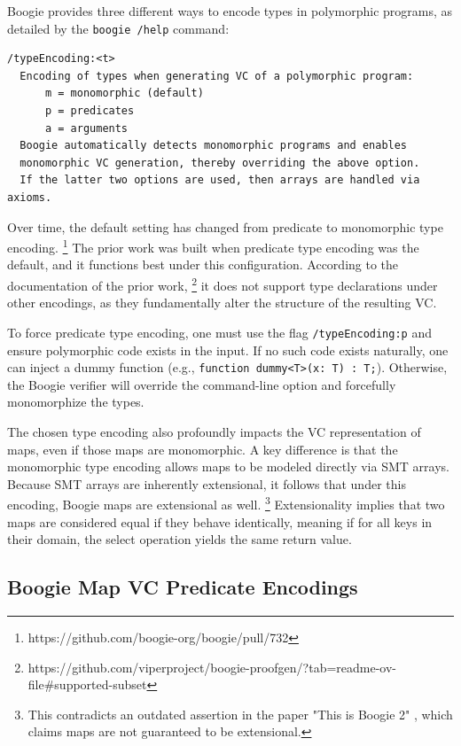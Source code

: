 \documentclass[11pt]{article}
\begin{document}
Boogie provides three different ways to encode types in polymorphic programs,
as detailed by the \texttt{boogie /help} command:

\begin{verbatim}
/typeEncoding:<t>
  Encoding of types when generating VC of a polymorphic program:
      m = monomorphic (default)
      p = predicates
      a = arguments
  Boogie automatically detects monomorphic programs and enables
  monomorphic VC generation, thereby overriding the above option.
  If the latter two options are used, then arrays are handled via axioms.
\end{verbatim}

Over time, the default setting has changed from predicate to monomorphic type encoding.
\footnote{https://github.com/boogie-org/boogie/pull/732}
The prior work was built when predicate type encoding was the default,
and it functions best under this configuration.
According to the documentation of the prior work,
\footnote{https://github.com/viperproject/boogie-proofgen/?tab=readme-ov-file\#supported-subset}
it does not support type declarations under other encodings,
as they fundamentally alter the structure of the resulting VC.

To force predicate type encoding, one must use the flag \texttt{/typeEncoding:p}
and ensure polymorphic code exists in the input.
If no such code exists naturally, one can inject a dummy function
(e.g., \texttt{function dummy<T>(x: T) : T;}).
Otherwise, the Boogie verifier will override the command-line option and forcefully monomorphize the types.

The chosen type encoding also profoundly impacts the VC representation of maps,
even if those maps are monomorphic.
A key difference is that the monomorphic type encoding allows maps to be modeled directly via SMT arrays.
Because SMT arrays are inherently extensional, it follows that under this encoding, Boogie maps are extensional as well.
\footnote{This contradicts an outdated assertion in the paper "This is Boogie 2" \cite{leino2008boogie}, which claims maps are not guaranteed to be extensional.}
Extensionality implies that two maps are considered equal if they behave identically,
meaning if for all keys in their domain, the select operation yields the same return value.


\subsection{Boogie Map VC Predicate Encodings}
\label{sec:vc-axioms-changes}
\label{sec:vc-map-axioms}
\label{sec:vc-structure}
\end{document}

